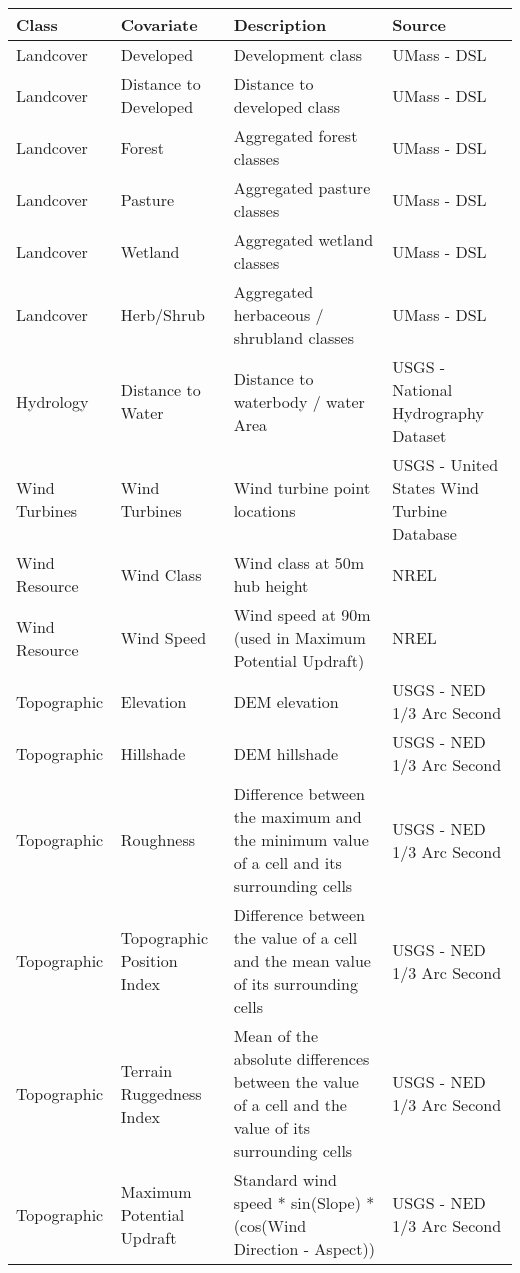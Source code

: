 \begingroup\fontsize{11pt}{12pt}\selectfont
\begin{tabularx}{\textwidth}{L{.7}L{.8}L{1.6}L{.9}}
  \toprule
{\textbf{Class}} & {\textbf{Covariate}} & {\textbf{Description}} & {\textbf{Source}} \\ 
  \midrule
Landcover & Developed & Development class & UMass - DSL \\ 
  Landcover & Distance to Developed & Distance to developed class & UMass - DSL \\ 
  Landcover & Forest & Aggregated forest classes & UMass - DSL \\ 
  Landcover & Pasture & Aggregated pasture classes & UMass - DSL \\ 
  Landcover & Wetland & Aggregated wetland classes & UMass - DSL \\ 
  Landcover & Herb/Shrub & Aggregated herbaceous / shrubland classes & UMass - DSL \\ 
  Hydrology & Distance to Water & Distance to waterbody / water Area & USGS - National Hydrography Dataset \\ 
  Wind Turbines & Wind Turbines & Wind turbine point locations & USGS - United States Wind Turbine Database \\ 
  Wind Resource & Wind Class & Wind class at 50m hub height & NREL \\ 
  Wind Resource & Wind Speed & Wind speed at 90m (used in Maximum Potential Updraft) & NREL \\ 
  Topographic & Elevation & DEM elevation & USGS - NED 1/3 Arc Second \\ 
  Topographic & Hillshade & DEM hillshade & USGS - NED 1/3 Arc Second \\ 
  Topographic & Roughness & Difference between the maximum and the minimum value of a cell and its surrounding cells & USGS - NED 1/3 Arc Second \\ 
  Topographic & Topographic Position Index & Difference between the value of a cell and the mean value of its surrounding cells & USGS - NED 1/3 Arc Second \\ 
  Topographic & Terrain Ruggedness Index & Mean of the absolute differences between the value of a cell and the value of its surrounding cells & USGS - NED 1/3 Arc Second \\ 
  Topographic & Maximum Potential Updraft & Standard wind speed * sin(Slope) * (cos(Wind Direction - Aspect)) & USGS - NED 1/3 Arc Second \\ 
   \bottomrule
\end{tabularx}
\endgroup
